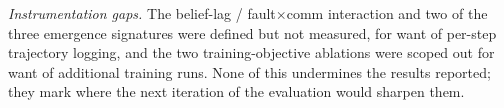 \emph{Instrumentation gaps.} The belief-lag / fault$\times$comm interaction and
two of the three emergence signatures were defined but not measured, for want of
per-step trajectory logging, and the two training-objective ablations were scoped
out for want of additional training runs. None of this undermines the results
reported; they mark where the next iteration of the evaluation would sharpen
them.
